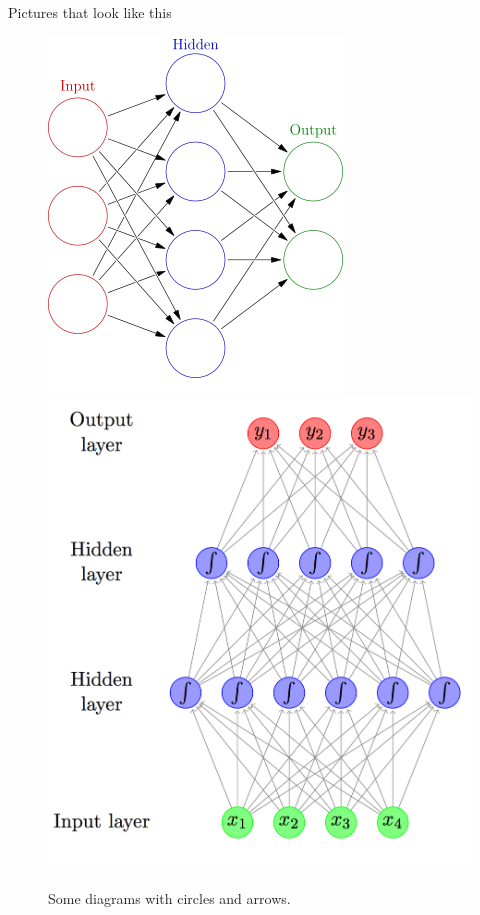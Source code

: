 \documentclass[11pt]{beamer}
\begin{document}
\begin{frame}{Pictures that look like this}
\begin{center}
\begin{figure}
\includegraphics[scale=0.25]{296px-Colored_neural_network}
\hspace{5mm}
\includegraphics[scale=0.15]{Feed-forward-neural-network-with-two-hidden-layers}
\caption{Some diagrams with circles and arrows.}
\end{figure}
\end{center}

\end{frame}
\end{document}
